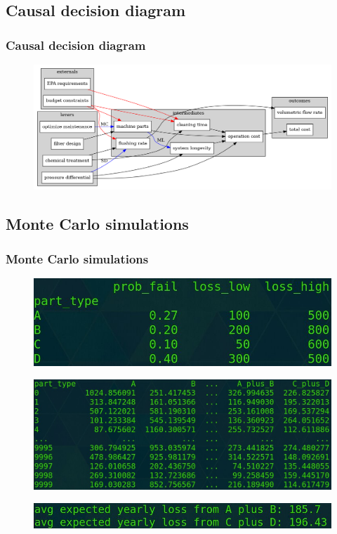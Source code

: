\documentclass[
	11pt, %
]{beamer}
\begin{document}
\subsection{Causal decision diagram}

\begin{frame}
    \frametitle{Causal decision diagram}
	\begin{figure}
		\includegraphics[width=1.0\linewidth]{causal_decision_diagram.png}
	\end{figure}
\end{frame}


\subsection{Monte Carlo simulations}

\begin{frame}
    \frametitle{Monte Carlo simulations}
	\begin{figure}
		\includegraphics[width=0.5\linewidth]{machine_parts.jpg}
	\end{figure}
	\begin{figure}
	    \includegraphics[width=0.8\linewidth]
	    {projected_losses.jpg}
	\end{figure}
	\begin{figure}
		\includegraphics[width=0.6\linewidth]
		{parts_choice.jpg}
	\end{figure}

\end{frame}
\end{document}

